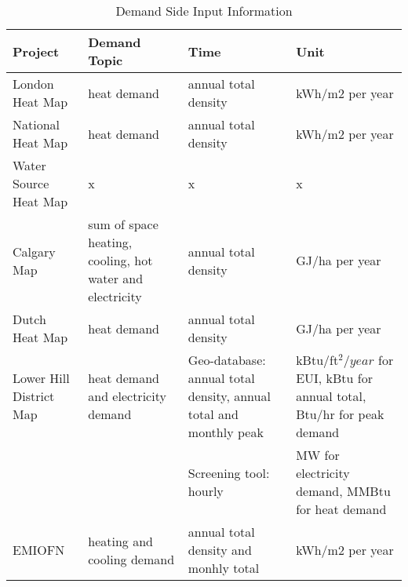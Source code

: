 \begin{table}[h!]
\centering
\caption{Demand Side Input Information}
\label{tab:demandInfo}
\begin{tabular}{p{3cm}|p{3cm}|p{3cm}|p{3cm}}
  \hline
  Project                 & Demand Topic                                             & Time                                        & Unit                      \\
  \hline
  \hline
  London Heat Map         & heat demand                                              & annual total density                                & kWh/m2 per year           \\
  \hline
  National Heat Map       & heat demand                                              & annual total density                                & kWh/m2 per year           \\
  \hline
  Water Source Heat Map   & x                                                        & x                                           & x                         \\
  \hline
  Calgary Map             & sum of space heating, cooling, hot water and electricity & annual total density                                & GJ/ha per year            \\
  \hline
  Dutch Heat Map          & heat demand                                              & annual total density                                & GJ/ha per year            \\
  \hline
  Lower Hill District Map & heat demand and electricity demand                       & Geo-database: annual total density, annual total and monthly peak & kBtu/ft$^2/year$ for EUI, kBtu for annual total, Btu/hr for peak demand \\ 
  \cline{3-4}
                          &                                                          & Screening tool: hourly                      & MW for electricity demand, MMBtu for heat demand     \\
  \hline
  EMIOFN                  & heating and cooling demand                                              & annual total density and monhly total              & kWh/m2 per year          \\
  \hline
\end{tabular}
\end{table}

